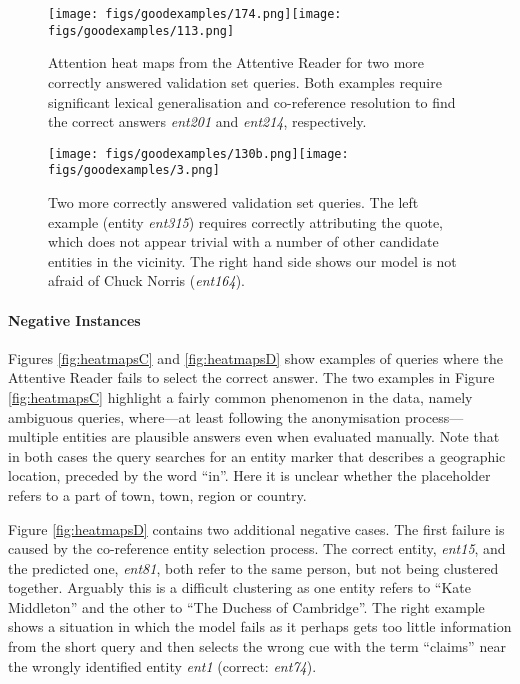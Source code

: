 \documentclass{article}
\begin{document}
\begin{figure}[h]
  \centering
  \texttt{[image: figs/goodexamples/174.png]}\texttt{[image: figs/goodexamples/113.png]}
  \caption{
	   Attention heat maps from the Attentive Reader for two more
           correctly answered validation set queries. Both examples
           require significant lexical generalisation and co-reference
           resolution to find the correct answers \textit{ent201} and
           \textit{ent214}, respectively.
       }
  \label{fig:heatmapsA}
\end{figure}

\begin{figure}[t]
  \centering
  \texttt{[image: figs/goodexamples/130b.png]}\texttt{[image: figs/goodexamples/3.png]}
  \caption{
    Two more
    correctly answered validation set queries. The left example (entity
    \textit{ent315}) requires correctly attributing the quote, which does not
    appear trivial with a number of other candidate entities in the vicinity.
    The right hand side shows our model is not afraid of Chuck Norris
    (\textit{ent164}).
  }
  \label{fig:heatmapsB}
\end{figure}

\paragraph{Negative Instances}
Figures \ref{fig:heatmapsC} and \ref{fig:heatmapsD} show examples of queries
where the Attentive Reader fails to select the correct answer. The two examples
in Figure \ref{fig:heatmapsC} highlight a fairly common phenomenon in the data,
namely ambiguous queries, where---at least following the anonymisation
process---multiple entities are plausible answers even when evaluated manually.
Note that in both cases the query searches for an entity marker that describes a
geographic location, preceded by the word ``in''. Here it is unclear whether
the placeholder refers to a part of town, town, region or country.

Figure \ref{fig:heatmapsD} contains two additional negative cases. The first
failure is caused by the co-reference entity selection process. The correct
entity, \textit{ent15}, and the predicted one, \textit{ent81}, both refer to the
same person, but not being clustered together. Arguably this is a difficult
clustering as one entity refers to ``Kate Middleton'' and the other to ``The
Duchess of Cambridge''.
The right example shows a situation in which the model fails as it
perhaps gets too little information from the short query and then selects the
wrong cue with the term ``claims'' near the wrongly identified entity
\textit{ent1} (correct: \textit{ent74}).
\end{document}
